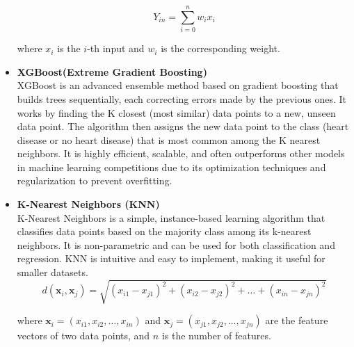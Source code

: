 \documentclass[12pt]{article}
\begin{document}
\begin{itemize}
\begin{equation}
Y_{in} = \sum_{i=0}^{n} w_i x_i
\end{equation}

where \( x_i \) is the \( i \)-th input and \( w_i \) is the corresponding weight.

\item \textbf{XGBoost(Extreme Gradient Boosting)} \\
XGBoost is an advanced ensemble method based on gradient boosting that builds trees sequentially, each correcting errors made by the previous ones. It works by finding the K closest (most similar) data points to a new, unseen data point. The algorithm then assigns the new data point to the class (heart disease or no heart disease) that is most common among the K nearest neighbors. It is highly efficient, scalable, and often outperforms other models in machine learning competitions due to its optimization techniques and regularization to prevent overfitting.

\item \textbf{K-Nearest Neighbors (KNN)} \\
K-Nearest Neighbors is a simple, instance-based learning algorithm that classifies data points based on the majority class among its k-nearest neighbors. It is non-parametric and can be used for both classification and regression. KNN is intuitive and easy to implement, making it useful for smaller datasets.
\begin{equation}
d(\mathbf{x}_i, \mathbf{x}_j) = \sqrt{(x_{i1} - x_{j1})^2 + (x_{i2} - x_{j2})^2 + \dots + (x_{in} - x_{jn})^2}
\end{equation}

where \( \mathbf{x}_i = (x_{i1}, x_{i2}, \dots, x_{in}) \) and \( \mathbf{x}_j = (x_{j1}, x_{j2}, \dots, x_{jn}) \) are the feature vectors of two data points, and \( n \) is the number of features.

\end{itemize}
\end{document}
